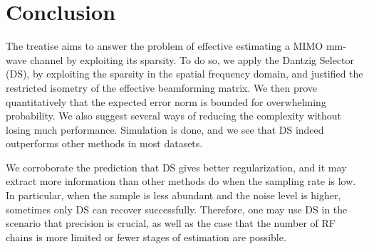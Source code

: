 
\chapter {Conclusion}

The treatise aims to answer the problem of effective estimating a MIMO mm-wave channel by exploiting its sparsity.
To do so, we apply the Dantzig Selector (DS), by exploiting the sparsity in the spatial frequency domain, and justified the restricted isometry of the effective beamforming matrix.
We then prove quantitatively that the expected error norm is bounded for overwhelming probability.
We also suggest several ways of reducing the complexity without losing much performance.
Simulation is done, and we see that DS indeed outperforms other methods in most datasets.

We corroborate the prediction that DS gives better regularization, and it may extract more information than other methods do when the sampling rate is low.
In particular, when the sample is less abundant and the noise level is higher, sometimes only DS can recover successfully.
Therefore, one may use DS in the scenario that precision is crucial, as well as the case that the number of RF chains is more limited or fewer stages of estimation are possible.

